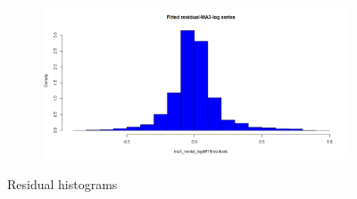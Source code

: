 \documentclass[12pt]{article}
\begin{document}
\begin{figure}[H]
\begin{subfigure}[b]{0.49\linewidth}
  \end{subfigure}
  \begin{subfigure}[b]{0.49\linewidth}
    \includegraphics[width=\linewidth]{figure11-4.png}
  \end{subfigure}
  \caption{Residual histograms}
  \label{fig:figure11}
\end{figure}
\end{document}
